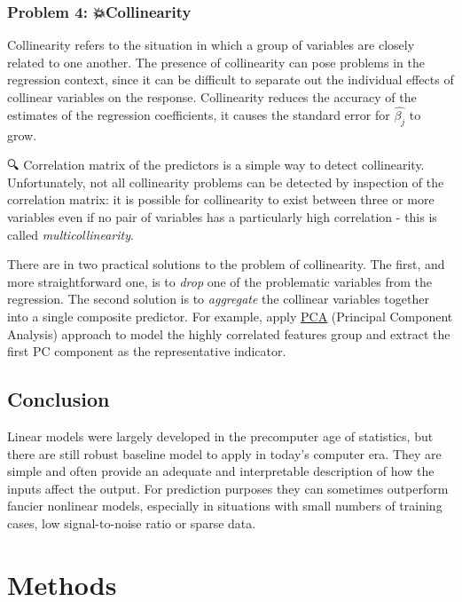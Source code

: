 \documentclass[
]{book}
\begin{document}
\hypertarget{problem-4-collinearity}{%
\subsection*{Problem 4: 💥Collinearity}\label{problem-4-collinearity}}

Collinearity refers to the situation in which a group of variables are closely related to one another. The presence of collinearity can pose problems in the regression context, since it can be difficult to separate out the individual effects of collinear variables on the response. Collinearity reduces the accuracy of the estimates of the regression coefficients, it causes the standard error for \(\hat{\beta_j}\) to grow.

🔍 {Correlation matrix of the predictors} is a simple way to detect collinearity. Unfortunately, not all collinearity problems can be detected by inspection of the correlation matrix: it is possible for collinearity to exist between three or more variables even if no pair of variables has a particularly high correlation - this is called {\emph{multicollinearity}}.

There are in two practical solutions to the problem of collinearity. The first, and more straightforward one, is to {\emph{drop}} one of the problematic variables from the regression. The second solution is to {\emph{aggregate}} the collinear variables together into a single composite predictor. For example, apply \href{https://en.wikipedia.org/wiki/Principal_component_analysis}{PCA} (Principal Component Analysis) approach to model the highly correlated features group and extract the first PC component as the representative indicator.

\hypertarget{conclusion}{%
\section{Conclusion}\label{conclusion}}

Linear models were largely developed in the precomputer age of statistics, but there are still robust baseline model to apply in today's computer era. They are simple and often provide an adequate and interpretable description of how the inputs affect the output. For prediction purposes they can sometimes outperform fancier nonlinear models, especially in situations with small numbers of training cases, low signal-to-noise ratio or sparse data.

\hypertarget{methods}{%
\chapter{Methods}\label{methods}}
\end{document}
